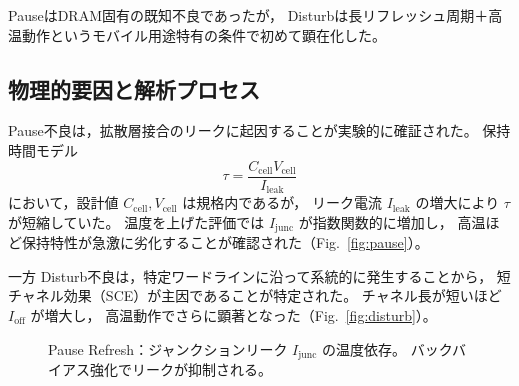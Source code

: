 \documentclass[conference]{IEEEtran}
\begin{document}
PauseはDRAM固有の既知不良であったが，
Disturbは長リフレッシュ周期＋高温動作というモバイル用途特有の条件で初めて顕在化した。

\subsection{物理的要因と解析プロセス}
Pause不良は，拡散層接合のリークに起因することが実験的に確証された。
保持時間モデル
\[
\tau = \frac{C_{\mathrm{cell}} V_{\mathrm{cell}}}{I_{\mathrm{leak}}}
\]
において，設計値 $C_{\mathrm{cell}}, V_{\mathrm{cell}}$ は規格内であるが，
リーク電流 $I_{\mathrm{leak}}$ の増大により $\tau$ が短縮していた。
温度を上げた評価では $I_{\mathrm{junc}}$ が指数関数的に増加し，
高温ほど保持特性が急激に劣化することが確認された（Fig.~\ref{fig:pause}）。

一方 Disturb不良は，特定ワードラインに沿って系統的に発生することから，
短チャネル効果（SCE）が主因であることが特定された。
チャネル長が短いほど $I_{\mathrm{off}}$ が増大し，
高温動作でさらに顕著となった（Fig.~\ref{fig:disturb}）。

\begin{figure}[t]
\centering
{}
\caption{Pause Refresh：ジャンクションリーク $I_{\mathrm{junc}}$ の温度依存。
バックバイアス強化でリークが抑制される。}
\label{fig:pause_temp}
\end{figure}
\end{document}

